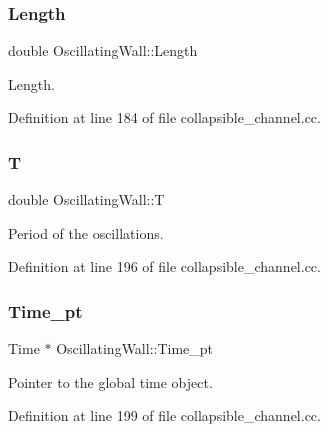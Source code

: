 \subsubsection{\texorpdfstring{Length}{Length}}
{\footnotesize\ttfamily double Oscillating\+Wall\+::\+Length\hspace{0.3cm}{\ttfamily [private]}}



Length. 



Definition at line 184 of file collapsible\+\_\+channel.\+cc.

\mbox{\label{classOscillatingWall_af33b31988c823d33a3b147281ec94599}} 
\subsubsection{\texorpdfstring{T}{T}}
{\footnotesize\ttfamily double Oscillating\+Wall\+::T\hspace{0.3cm}{\ttfamily [private]}}



Period of the oscillations. 



Definition at line 196 of file collapsible\+\_\+channel.\+cc.

\mbox{\label{classOscillatingWall_a9c4bea6ec6e80ba23139cd5a1d4d25d5}} 
\subsubsection{\texorpdfstring{Time\+\_\+pt}{Time\_pt}}
{\footnotesize\ttfamily Time $\ast$ Oscillating\+Wall\+::\+Time\+\_\+pt\hspace{0.3cm}{\ttfamily [private]}}



Pointer to the global time object. 



Definition at line 199 of file collapsible\+\_\+channel.\+cc.

\mbox{\label{classOscillatingWall_a71a60ee3294746875a24aeeffb38f7ec}} 
